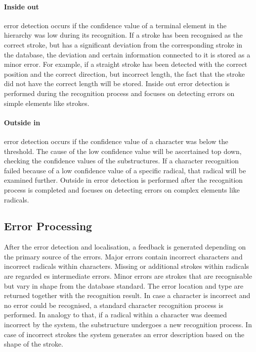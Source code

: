 \paragraph{Inside out} error detection occurs if the confidence value of a 
terminal element in the hierarchy was low during its recognition. 
If a stroke has been recognised as the correct stroke, but has a significant 
deviation from the corresponding stroke in the database, the deviation and 
certain information connected to it is stored as a minor error.
For example, if a straight stroke has been detected with the correct position
and the correct direction, but incorrect length, the fact that the stroke
did not have the correct length will be stored. Inside out error detection
is performed during the recognition process and focuses on detecting 
errors on simple elements like strokes.

\paragraph{Outside in} error detection occurs if the confidence value of a 
character was below the threshold. The cause of the low confidence value will be 
ascertained top down, checking the confidence values of the substructures.
If a character recognition failed because of a low confidence value of
a specific radical, that radical will be examined further.
Outside in error detection is performed after the recognition process is 
completed and focuses on detecting errors on complex elements like radicals.

\subsection{Error Processing}
\label{sec:hwre:errorprocessing}

After the error detection and localisation, a feedback is generated 
depending on the primary source of the errors. Major errors contain incorrect 
characters and incorrect radicals within characters.
Missing or additional strokes within radicals are regarded es intermediate
errors. Minor errors are strokes that are recognisable but vary in shape from 
the database standard. The error location and type are returned together with 
the recognition result. In case a character is incorrect and no error could be 
recognised, a standard character recognition process is performed.
In analogy to that, if a radical within a character was deemed incorrect by
the system, the substructure undergoes a new recognition process.
In case of incorrect strokes the system generates an error description based
on the shape of the stroke.

